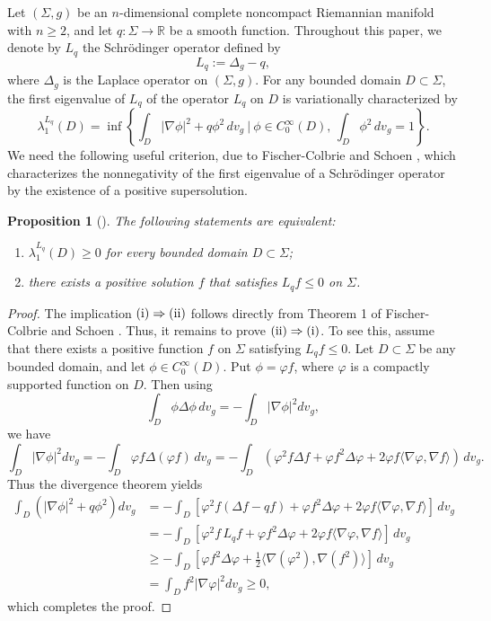 \documentclass[amssymb,amstex,amsmath,11pt]{article}
\numberwithin{equation}{section}
\theoremstyle{plain}
\newtheorem{prop}[thm]{Proposition}
\theoremstyle{definition}
\theoremstyle{remark}
\newcommand{\lap}{\Delta}
\begin{document}
Let $(\Sigma,g)$ be an $n$-dimensional complete noncompact Riemannian manifold with $n\geq 2$, and let $q:\Sigma\to\mathbb{R}$ be a smooth function. Throughout this paper, we denote by $L_q$ the Schr\"odinger operator defined by
$$
L_q := \Delta_g - q,
$$
where $\Delta_g$ is the Laplace operator on $(\Sigma,g)$. For any bounded domain $D\subset\Sigma$, the first eigenvalue of $L_q$ of the operator $L_q$ on $D$ is variationally characterized by
$$\lambda_1^{L_q}(D) = \inf\left\{\int_D|\nabla \phi|^2 + q \phi^2\,dv_g~|~\phi\in C^{\infty}_{0}(D),\,\int_D\phi^2\,dv_g=1\right\}.$$
We need the following useful criterion, due to Fischer-Colbrie and Schoen \cite{FC&S80}, which characterizes the nonnegativity of the first eigenvalue of a Schr\"odinger operator by the existence of a positive supersolution.

\begin{prop}[\cite{FC&S80}]\label{prop0}
The following statements are equivalent:
\begin{enumerate}
    \item[{\rm (i)}] $\lambda_1^{L_q}(D)\geq0$ for every bounded domain $D\subset\Sigma$;
    \item[{\rm (ii)}] there exists a positive solution $f$ that satisfies $L_q f\leq0$ on $\Sigma$.
\end{enumerate}
\end{prop}



\begin{proof}
The implication ${\rm (i)}\Rightarrow {\rm (ii)}$ follows directly from Theorem 1 of Fischer-Colbrie and Schoen \cite{FC&S80}. Thus, it remains to prove ${\rm (ii)}\Rightarrow {\rm (i)}$. To see this, assume that there exists a positive function $f$ on $\Sigma$ satisfying $L_q f\leq 0$. Let $D\subset \Sigma$ be any bounded domain, and let $\phi\in C_0^\infty(D)$. Put $\phi=\varphi f$, where $\varphi$ is a compactly supported function on $D$. Then using
    $$\int_{D}\phi\lap \phi \,dv_g = -\int_{D}|\nabla \phi|^2 dv_g,$$
    we have
    $$\int_{D}|\nabla \phi|^2dv_g = -\int_{D}\varphi f\lap(\varphi f)\,dv_g =-\int_{D}(\varphi^2f\lap f + \varphi f^2\lap\varphi+2\varphi f\langle\nabla\varphi,\nabla f\rangle)\,dv_g.$$
   Thus the divergence theorem yields
    \begin{align}\label{i}
       \int_D (|\nabla \phi|^2 + q \phi^2) dv_g& = -\int_{D}[\varphi^2 f (\lap f - q f) + \varphi f^2\lap\varphi+2\varphi f\langle\nabla\varphi,\nabla f\rangle] \,dv_g\nonumber\\
        & = -\int_{D}[\varphi^2 f \, L_q f + \varphi f^2\lap\varphi+2\varphi f\langle\nabla\varphi,\nabla f\rangle]\,dv_g \nonumber\\
        & \geq -\int_{D}[ \varphi f^2\lap\varphi + \frac{1}{2}\langle\nabla(\varphi^2),\nabla (f^2)\rangle]\,dv_g \nonumber\\
        & =\int_{D} f^2|\nabla\varphi|^2 dv_g \geq 0,
    \end{align}
    which completes the proof.
\end{proof}
\end{document}
